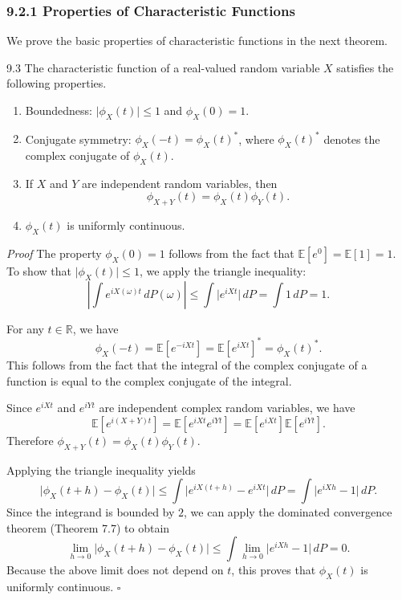 \subsubsection*{9.2.1 Properties of Characteristic Functions}

We prove the basic properties of characteristic functions in the next theorem.

\begin{thmbox}{9.3}
The characteristic function of a real-valued random variable $X$ satisfies the following properties.
\begin{enumerate}
\item Boundedness: $\lvert\phi_X(t)\rvert\leq 1$ and $\phi_X(0)=1$.
\item Conjugate symmetry: $\phi_X(-t)=\phi_X(t)^*$, where $\phi_X(t)^*$ denotes the complex conjugate of $\phi_X(t)$.
\item If $X$ and $Y$ are independent random variables, then
\[
\phi_{X+Y}(t)=\phi_X(t)\phi_Y(t).
\]
\item $\phi_X(t)$ is uniformly continuous.
\end{enumerate}
\end{thmbox}

\textit{Proof}
The property $\phi_X(0)=1$ follows from the fact that $\mathbb{E}[e^0]=\mathbb{E}[1]=1$. To show that $\lvert\phi_X(t)\rvert\leq 1$, we apply the triangle inequality:
\[
\left\lvert \int e^{iX(\omega)t}\,dP(\omega)\right\rvert
\leq \int \lvert e^{iXt}\rvert\,dP
=\int 1\,dP=1.
\]

For any $t\in\mathbb{R}$, we have
\[
\phi_X(-t)=\mathbb{E}[e^{-iXt}]
=\mathbb{E}[e^{iXt}]^*
=\phi_X(t)^*.
\]
This follows from the fact that the integral of the complex conjugate of a function is equal to the complex conjugate of the integral.

Since $e^{iXt}$ and $e^{iYt}$ are independent complex random variables, we have
\[
\mathbb{E}[e^{i(X+Y)t}]
=\mathbb{E}[e^{iXt}e^{iYt}]
=\mathbb{E}[e^{iXt}]\mathbb{E}[e^{iYt}].
\]
Therefore $\phi_{X+Y}(t)=\phi_X(t)\phi_Y(t)$.

Applying the triangle inequality yields
\[
\lvert\phi_X(t+h)-\phi_X(t)\rvert
\leq \int \lvert e^{iX(t+h)}-e^{iXt}\rvert\,dP
=\int \lvert e^{iXh}-1\rvert\,dP.
\]
Since the integrand is bounded by $2$, we can apply the dominated convergence theorem (Theorem 7.7) to obtain
\[
\lim_{h\to 0}\lvert\phi_X(t+h)-\phi_X(t)\rvert
\leq \int \lim_{h\to 0}\lvert e^{iXh}-1\rvert\,dP=0.
\]
Because the above limit does not depend on $t$, this proves that $\phi_X(t)$ is uniformly continuous.
\hfill $\square$

